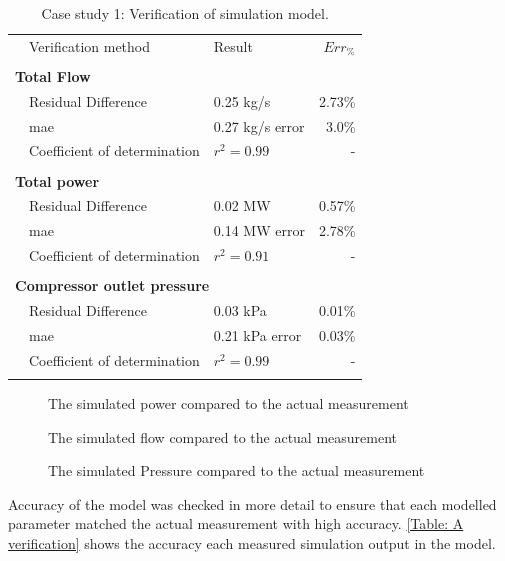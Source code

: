  \begin{table}[h!]
	\label{Beet verification table}
	\centering
	\begin{tabular}{p{0.5cm}p{8cm}p{5cm}r}
		\hline
		&Verification method & Result & $Err_{\%}$\\
		\hhline{====}
		\\ \multicolumn{4}{l}{\textbf{ Total Flow}}\\
		&Residual Difference          & 0.25 kg/s  & 2.73\% \\
		&\gls{mae} 					 & 0.27 kg/s error & 3.0\% \\
		&Coefficient of determination & $r^2 =0.99$   & -\\ 
		\\ \multicolumn{4}{l}{\textbf{ Total power}}\\
		&Residual Difference          & 0.02 MW  & 0.57\% \\
		&\gls{mae} 					 & 0.14 MW error & 2.78\% \\
		 &Coefficient of determination & $r^2 =0.91$   & -\\ 
		\\ \multicolumn{4}{l}{\textbf{ Compressor outlet pressure}}\\
		&Residual Difference          &0.03 kPa   & 0.01\% \\
		&\gls{mae} 					 & 0.21 kPa error & 0.03\% \\
		&Coefficient of determination & $r^2 =0.99$   & -\\
	\\ 	\hline
	\end{tabular} 
	\caption{Case study 1: Verification of simulation model.}
\end{table}
\begin{figure}[h!]
	\centering
	
	\caption{The simulated power compared to the actual measurement}
	\label{fig: Verification power Beatrix}
\end{figure}
\begin{figure}[h!]
	\centering
	
	\caption{The simulated flow compared to the actual measurement}
	\label{fig: Verification flow Beatrix}
\end{figure}
\begin{figure}[h!]
	\centering
	
	\caption{The simulated Pressure compared to the actual measurement}
	\label{fig: Verification Pressure Beatrix}
\end{figure}
\par
Accuracy of the model was checked in more detail to ensure that each modelled parameter matched the actual measurement with high accuracy. \cref{Table: A verification} shows the accuracy each measured simulation output in the model.
\clearpage 
